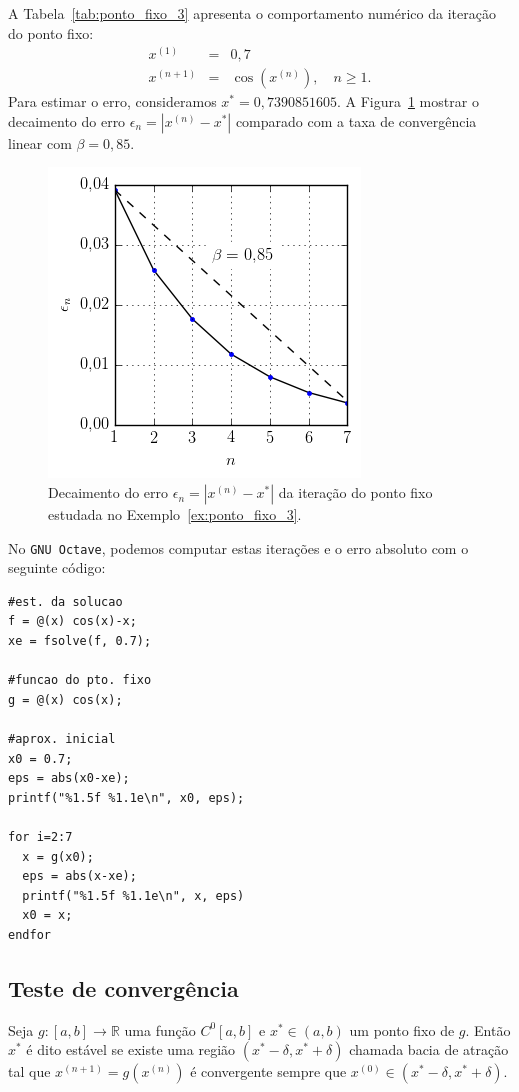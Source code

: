 \begin{ex}
\begin{sol}
A Tabela~\ref{tab:ponto_fixo_3} apresenta o comportamento numérico da iteração do ponto fixo:
\begin{eqnarray}
x^{(1)} &=& 0,7\\
x^{(n+1)} &=& \cos(x^{(n)}),\quad n\geq 1.
\end{eqnarray}
Para estimar o erro, consideramos $x^* = 0,7390851605$. A Figura~\ref{fig:ex_ponto_fixo_3} mostrar o decaimento do erro $\epsilon_n = |x^{(n)} - x^*|$ comparado com a taxa de convergência linear com $\beta = 0,85$.

\begin{figure}
  \centering
  \includegraphics{./cap_equacao1d/pics/ex_ponto_fixo_3/ex_ponto_fixo_3}
  \caption{Decaimento do erro $\epsilon_n = |x^{(n)}-x^*|$ da iteração do ponto fixo estudada no Exemplo~\ref{ex:ponto_fixo_3}.}
  \label{fig:ex_ponto_fixo_3}
\end{figure}

No \verb+GNU Octave+, podemos computar estas iterações e o erro absoluto com o seguinte código:
\begin{verbatim}
#est. da solucao
f = @(x) cos(x)-x;
xe = fsolve(f, 0.7);

#funcao do pto. fixo
g = @(x) cos(x);

#aprox. inicial
x0 = 0.7;
eps = abs(x0-xe);
printf("%1.5f %1.1e\n", x0, eps);

for i=2:7
  x = g(x0);
  eps = abs(x-xe);
  printf("%1.5f %1.1e\n", x, eps)
  x0 = x;
endfor
\end{verbatim}
\end{sol}

\subsection{Teste de convergência}
Seja $g:[a,b]\to\mathbb{R}$ uma função $C^0[a,b]$ e $x^*\in(a,b)$ um ponto fixo de $g$. Então $x^*$ é dito estável se existe uma região $(x^*-\delta,x^*+\delta)$ chamada bacia de atração tal que $x^{(n+1)}=g(x^{(n)})$ é convergente sempre que $x^{(0)}\in(x^*-\delta,x^*+\delta)$.


\end{ex}

